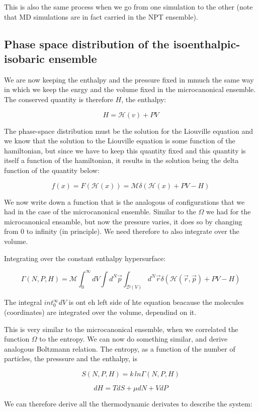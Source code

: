 	This is also the same process when we go from one simulation to the other (note that MD simulations are in fact carried in the NPT ensemble).

	\subsection{Phase space distribution of the isoenthalpic-isobaric ensemble}
	We are now keeping the enthalpy and the pressure fixed in mmuch the same way in which we keep the enrgy and the volume fixed in the microcanonical ensemble.
	The conserved quantity is therefore $H$, the enthalpy:

	$$H = \mathcal{H}(v) + PV$$

	The phase-space  distribution must be the solution for the Liouville equation and we know that the solution to the Liouville equation is some function of the hamiltonian, but since we have to keep this quantity fixed and this quantity is itself a function of the hamiltonian, it results in the solution being the delta function of the quantity below:

	$$f(x) = F(\mathcal{H}(x)) = \mathcal{M}\delta(\mathcal{H}(x)+PV-H)$$

	We now write down a function that is the analogous of configurations that we had in the case of the microcanonical ensemble. Similar to the $\Omega$ we had for the microcanonical ensamble, but now the pressure varies, it does so by changing from $0$ to infinity (in principle). We need therefore to also integrate over the volume.

	Integrating over the constant enthalpy hypersurface:

	$$\Gamma(N, P, H) = \mathcal{M}\int_0^{\infty}dV\int d^N\vec{p}\int_{\mathcal{D}(V)}d^N\vec{r}\delta(\mathcal{H}(\vec{r}, \vec{p}) + PV-H)$$

	The integral $int_0^{\infty}dV$ is ont eh left side of hte equation beacause the molecules (coordinates) are integrated over the volume, dependind on it.

	This is very similar to the microcanonical ensemble, when we correlated the function $\Omega$ to the entropy. We can now do something similar, and derive analogous Boltzmann relation. The entropy, as a function of the number of particles, the presssure and the enthalpy, is

	$$S(N, P, H) = k \, ln \Gamma(N, P, H)$$

	$$dH = TdS + \mu dN + VdP$$

	We can therefore derive all the thermodynamic derivates to describe the system:

